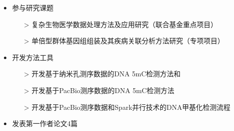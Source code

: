 \documentclass[zh]{resume}
\begin{document}

\begin{itemize}
  \item 参与研究课题
  \begin{itemize}
    \item[>] 复杂生物医学数据处理方法及应用研究（联合基金重点项目）
    \item[>] 单倍型群体基因组组装及其疾病关联分析方法研究（专项项目）
  \end{itemize}
  \item 开发方法工具
  \begin{itemize}
    \item[>] 开发基于纳米孔测序数据的DNA 5mC检测方法和
    \item[>] 开发基于PacBio测序数据的DNA 5mC检测方法
    \item[>] 开发基于PacBio测序数据和Spark并行技术的DNA甲基化检测流程
  \end{itemize}
  \item 发表第一作者论文4篇
\end{itemize}
\end{document}
